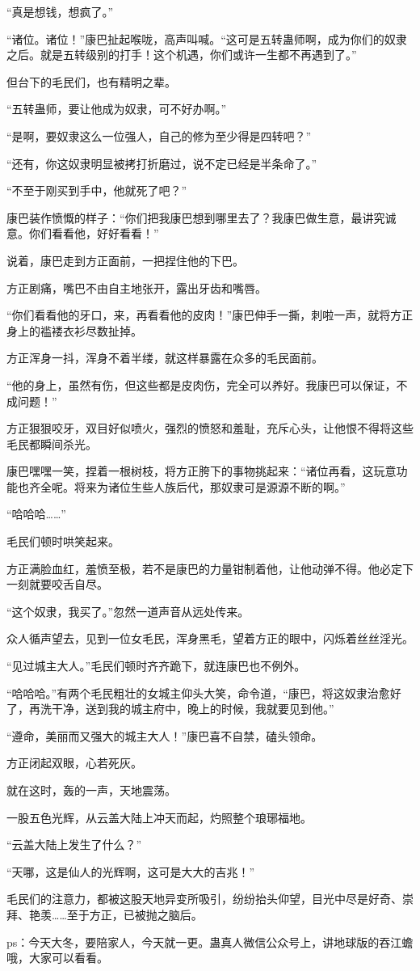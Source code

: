 \begin{this_body}
“真是想钱，想疯了。”

“诸位。诸位！”康巴扯起喉咙，高声叫喊。“这可是五转蛊师啊，成为你们的奴隶之后。就是五转级别的打手！这个机遇，你们或许一生都不再遇到了。”

但台下的毛民们，也有精明之辈。

“五转蛊师，要让他成为奴隶，可不好办啊。”

“是啊，要奴隶这么一位强人，自己的修为至少得是四转吧？”

“还有，你这奴隶明显被拷打折磨过，说不定已经是半条命了。”

“不至于刚买到手中，他就死了吧？”

康巴装作愤慨的样子：“你们把我康巴想到哪里去了？我康巴做生意，最讲究诚意。你们看看他，好好看看！”

说着，康巴走到方正面前，一把捏住他的下巴。

方正剧痛，嘴巴不由自主地张开，露出牙齿和嘴唇。

“你们看看他的牙口，来，再看看他的皮肉！”康巴伸手一撕，刺啦一声，就将方正身上的褴褛衣衫尽数扯掉。

方正浑身一抖，浑身不着半缕，就这样暴露在众多的毛民面前。

“他的身上，虽然有伤，但这些都是皮肉伤，完全可以养好。我康巴可以保证，不成问题！”

方正狠狠咬牙，双目好似喷火，强烈的愤怒和羞耻，充斥心头，让他恨不得将这些毛民都瞬间杀光。

康巴嘿嘿一笑，捏着一根树枝，将方正胯下的事物挑起来：“诸位再看，这玩意功能也齐全呢。将来为诸位生些人族后代，那奴隶可是源源不断的啊。”

“哈哈哈……”

毛民们顿时哄笑起来。

方正满脸血红，羞愤至极，若不是康巴的力量钳制着他，让他动弹不得。他必定下一刻就要咬舌自尽。

“这个奴隶，我买了。”忽然一道声音从远处传来。

众人循声望去，见到一位女毛民，浑身黑毛，望着方正的眼中，闪烁着丝丝淫光。

“见过城主大人。”毛民们顿时齐齐跪下，就连康巴也不例外。

“哈哈哈。”有两个毛民粗壮的女城主仰头大笑，命令道，“康巴，将这奴隶治愈好了，再洗干净，送到我的城主府中，晚上的时候，我就要见到他。”

“遵命，美丽而又强大的城主大人！”康巴喜不自禁，磕头领命。

方正闭起双眼，心若死灰。

就在这时，轰的一声，天地震荡。

一股五色光辉，从云盖大陆上冲天而起，灼照整个琅琊福地。

“云盖大陆上发生了什么？”

“天哪，这是仙人的光辉啊，这可是大大的吉兆！”

毛民们的注意力，都被这股天地异变所吸引，纷纷抬头仰望，目光中尽是好奇、崇拜、艳羡……至于方正，已被抛之脑后。

ps：今天大冬，要陪家人，今天就一更。蛊真人微信公众号上，讲地球版的吞江蟾哦，大家可以看看。

\end{this_body}

